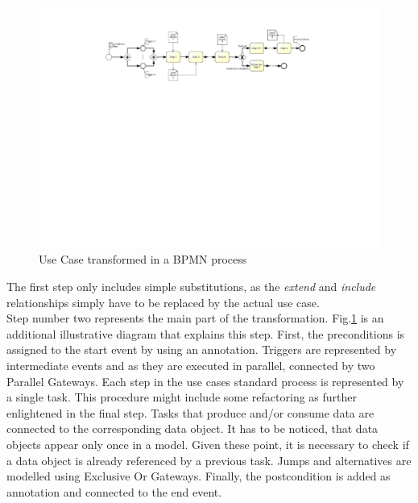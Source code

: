 \begin{figure}[h!]
	\includegraphics[width=\textwidth, trim={6cm 14.5cm 6cm 1.5cm}]{img/usecaseTransformation.pdf}
	\caption{Use Case transformed in a BPMN process}
	\label{fig:useCaseTransformation}
\end{figure}
The first step only includes simple substitutions, as the \textit{extend} and \textit{include} relationships simply have to be replaced by the actual use case.\\
Step number two represents the main part of the transformation. Fig.\ref{fig:useCaseTransformation} is an additional illustrative diagram that explains this step. First, the preconditions is assigned to the start event by using an annotation. Triggers are represented by intermediate events and as they are executed in parallel, connected by two Parallel Gateways. Each step in the use cases standard process is represented by a single task. This procedure might include some refactoring as further enlightened in the final step. Tasks that produce and/or consume data are connected to the corresponding data object. It has to be noticed, that data objects appear only once in a model. Given these point, it is necessary to check if a data object is already referenced by a previous task. Jumps and alternatives are modelled using Exclusive Or Gateways. Finally, the postcondition is added as annotation and connected to the end event. \\
